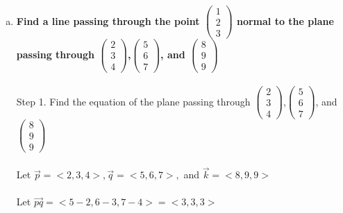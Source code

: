 \documentclass{article}
\begin{document}
\section{}
\begin{enumerate}[a.]
\item\textbf{Find a line passing through the point $\left(\!
    \begin{array}{c}
      1 \\
      2 \\
      3
    \end{array}
  \!\right)$ normal to the plane passing through $\left(\!
    \begin{array}{c}
      2 \\
      3 \\
      4
    \end{array}
  \!\right)$,$\left(\!
    \begin{array}{c}
      5 \\
      6 \\
      7
    \end{array}
  \!\right)$, and $\left(\!
    \begin{array}{c}
      8 \\
      9 \\
      9
    \end{array}
  \!\right)$ }\\
\\
Step 1. Find the equation of the plane passing through $\left(\!
    \begin{array}{c}
      2 \\
      3 \\
      4
    \end{array}
  \!\right)$,$\left(\!
    \begin{array}{c}
      5 \\
      6 \\
      7
    \end{array}
  \!\right)$, and $\left(\!
    \begin{array}{c}
      8 \\
      9 \\
      9
    \end{array}
  \!\right)$\\
  \\
  Let $\vec{p}=<2,3,4>, \vec{q}=<5,6,7>,$ and $\vec{k}=<8,9,9>$\\
  \\
  Let $\vec{pq} = <5-2,6-3,7-4>=<3,3,3>$\\
  \\

\end{enumerate}
\end{document}

